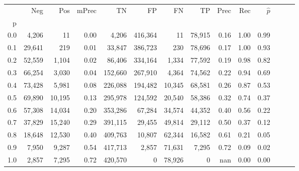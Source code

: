 \begin{tabular}{rrrrrrrrrrrrrr}
\toprule
{} &     Neg &     Pos & mPrec &       TN &       FP &      FN &      TP &  Prec &   Rec & $\hat{p}$ \\
p   &         &         &       &          &          &         &         &       &       &           \\
\midrule
0.0 &   4,206 &      11 &  0.00 &    4,206 &  416,364 &      11 &  78,915 &  0.16 &  1.00 &      0.99 \\
0.1 &  29,641 &     219 &  0.01 &   33,847 &  386,723 &     230 &  78,696 &  0.17 &  1.00 &      0.93 \\
0.2 &  52,559 &   1,104 &  0.02 &   86,406 &  334,164 &   1,334 &  77,592 &  0.19 &  0.98 &      0.82 \\
0.3 &  66,254 &   3,030 &  0.04 &  152,660 &  267,910 &   4,364 &  74,562 &  0.22 &  0.94 &      0.69 \\
0.4 &  73,428 &   5,981 &  0.08 &  226,088 &  194,482 &  10,345 &  68,581 &  0.26 &  0.87 &      0.53 \\
0.5 &  69,890 &  10,195 &  0.13 &  295,978 &  124,592 &  20,540 &  58,386 &  0.32 &  0.74 &      0.37 \\
0.6 &  57,308 &  14,034 &  0.20 &  353,286 &   67,284 &  34,574 &  44,352 &  0.40 &  0.56 &      0.22 \\
0.7 &  37,829 &  15,240 &  0.29 &  391,115 &   29,455 &  49,814 &  29,112 &  0.50 &  0.37 &      0.12 \\
0.8 &  18,648 &  12,530 &  0.40 &  409,763 &   10,807 &  62,344 &  16,582 &  0.61 &  0.21 &      0.05 \\
0.9 &   7,950 &   9,287 &  0.54 &  417,713 &    2,857 &  71,631 &   7,295 &  0.72 &  0.09 &      0.02 \\
1.0 &   2,857 &   7,295 &  0.72 &  420,570 &        0 &  78,926 &       0 &   nan &  0.00 &      0.00 \\
\bottomrule
\end{tabular}
